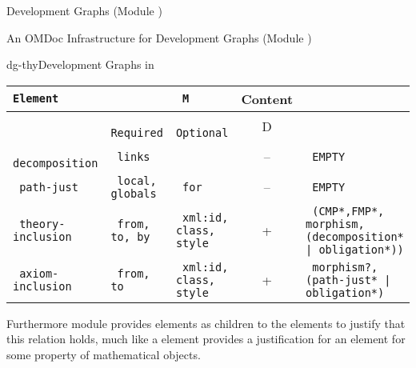 \begin{omgroup}[id=complex-theories,short=Complex Theories,
                            creators=miko,contributors=frabe]
\begin{omgroup}[id=development-graphs,short=Development Graphs]{Development Graphs (Module
  {})}
\begin{module}[id=dgraph]
\begin{omgroup}[id=dg-omdoc,short=OMDoc Development Graphs]{An OMDoc Infrastructure for
  Development Graphs (Module {})}
\begin{presonly}
\begin{myfig}{dg-thy}{Development Graphs in {\omdoc}}
\begin{scriptsize}
\begin{tabular}{|>{\tt}l|>{\tt}p{}|>{\tt}p{}|c|>{\tt}p{}|}\hline
{\rm Element}& \multicolumn{2}{l|}{Attributes} & M & Content  \\\hline
             & {\rm Required} & {\rm Optional} & D &           \\\hline\hline
 decomposition  & links       &                            & -- & EMPTY\\\hline
 path-just   & local, globals & for                        & -- & EMPTY\\\hline
 theory-inclusion & from, to, by  
                              & xml:id, class, style               & +  
                                          & (CMP*,FMP*, morphism, 
                                             (decomposition* | obligation*))\\\hline
 axiom-inclusion  & from, to  & xml:id, class, style           & +  
                                          & morphism?, (path-just* | obligation*)\\\hline
\end{tabular}
\end{scriptsize}
\end{myfig}
\end{presonly}

Furthermore module {} provides {} elements as children
to the {} elements to justify that this relation holds, much like
a {} element provides a justification for an {} element
for some property of mathematical objects.


\end{omgroup}
\end{module}
\end{omgroup}
\end{omgroup}
